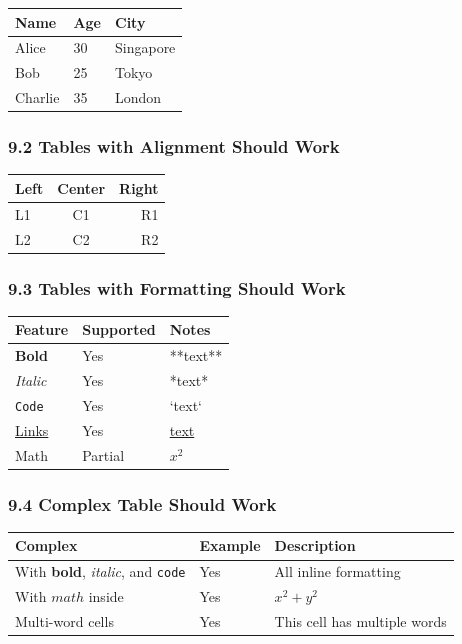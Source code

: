 \documentclass{article}
\begin{document}
\begin{tabular}{lll}
\hline
 Name  &  Age  &  City  \\
\hline
 Alice  &  30  &  Singapore  \\
 Bob  &  25  &  Tokyo  \\
 Charlie  &  35  &  London  \\
\hline
\end{tabular}

\subsubsection{ 9.2 Tables with Alignment Should Work}

\begin{tabular}{lcr}
\hline
 Left  &  Center  &  Right  \\
\hline
 L1  &  C1  &  R1  \\
 L2  &  C2  &  R2  \\
\hline
\end{tabular}

\subsubsection{ 9.3 Tables with Formatting Should Work}

\begin{tabular}{lll}
\hline
 Feature  &  Supported  &  Notes  \\
\hline
 \textbf{Bold}  &  Yes  &  **text**  \\
 \emph{Italic}  &  Yes  &  *text*  \\
 \texttt{Code}  &  Yes  &  `text`  \\
 \href{https://example.com}{Links}  &  Yes  &  \href{url}{text}  \\
 Math  &  Partial  &  $x^2$  \\
\hline
\end{tabular}

\subsubsection{ 9.4 Complex Table Should Work}

\begin{tabular}{lll}
\hline
 Complex  &  Example  &  Description  \\
\hline
 With \textbf{bold}, \emph{italic}, and \texttt{code}  &  Yes  &  All inline formatting  \\
 With $math$ inside  &  Yes  &  $x^2 + y^2$  \\
 Multi-word cells  &  Yes  &  This cell has multiple words  \\
\hline
\end{tabular}
\end{document}
